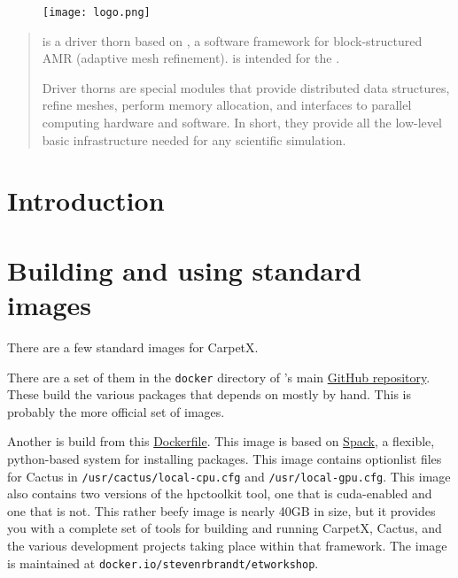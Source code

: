 \begin{figure}[ht]
    \begin{center}
        \texttt{[image: logo.png]}
    \end{center}
    \label{fig:logo}
\end{figure}

\newpage

\begin{abstract}

\CarpetX\space is a \href{https://www.cactuscode.org/index.html}{\Cactus} driver thorn based on \href{https://amrex-codes.github.io/}{\AMReX}, a software framework for block-structured AMR (adaptive mesh refinement). \CarpetX\space is intended for the \href{https://einsteintoolkit.org/}{\ETK}.

Driver thorns are special modules that provide distributed data structures, refine meshes, perform memory allocation, and interfaces to parallel computing hardware and software. In short, they provide all the low-level basic infrastructure needed for any scientific simulation.

\end{abstract}

\newpage

\tableofcontents

\newpage

\section{Introduction}
\label{sec:intro}


\section{Building and using standard images}
\label{sec:std_imgs}

There are a few standard images for CarpetX.

There are a set of them in the \texttt{docker} directory of \CarpetX's main \href{https://github.com/eschnett/CarpetX}{GitHub repository}. These build the various packages that \CarpetX\space depends on mostly by hand. This is probably the more official set of images.

Another is build from this \href{https://github.com/stevenrbrandt/carpetx-install}{Dockerfile}. This image is based on \href{https://github.com/spack/spack}{Spack}, a flexible, python-based system for installing packages. This image contains optionlist files for Cactus in \texttt{/usr/cactus/local-cpu.cfg} and \texttt{/usr/local-gpu.cfg}. This image also contains two versions of the hpctoolkit tool, one that is cuda-enabled and one that is not. This rather beefy image is nearly 40GB in size, but it provides you with a complete set of tools for building and running CarpetX, Cactus, and the various development projects taking place within that framework. The image is maintained at \texttt{docker.io/stevenrbrandt/etworkshop}.

